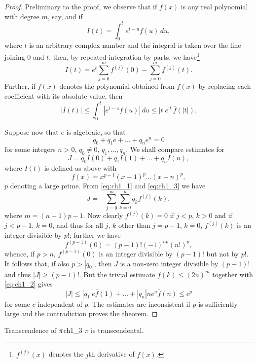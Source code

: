\begin{proof}
Preliminary to the proof, we observe that if $f(x)$ is any real polynomial with degree $m$, say, and if
\[
I(t) = \int_0^t e^{t-u} f(u) \, du,
\]
where $t$ is an arbitrary complex number and the integral is taken over the line joining $0$ and $t$, then, by repeated integration by parts, we have\footnote{$f^{(j)}(x)$ denotes the $j$th derivative of $f(x)$.}
\begin{equation} \label{eq:ch1_1}\tag{1}
I(t) = e^t \sum_{j=0}^m f^{(j)}(0) - \sum_{j=0}^m f^{(j)}(t).
\end{equation}
Further, if $\bar{f}(x)$ denotes the polynomial obtained from $f(x)$ by replacing each coefficient with its absolute value, then
\begin{equation} \label{eq:ch1_2}\tag{2}
|I(t)| \le \int_0^t |e^{t-u} f(u)| \, du \le |t| e^{|t|} \bar{f}(|t|).
\end{equation}

Suppose now that $e$ is algebraic, so that
\begin{equation} \label{eq:ch1_3}\tag{3}
q_0 + q_1 e + \dots + q_n e^n = 0
\end{equation}
for some integers $n>0$, $q_0 \neq 0$, $q_1, \dots, q_n$. We shall compare estimates for
\[
J = q_0 I(0) + q_1 I(1) + \dots + q_n I(n),
\]
where $I(t)$ is defined as above with
\[
f(x) = x^{p-1} (x-1)^p \dots (x-n)^p,
\]
$p$ denoting a large prime. From \eqref{eq:ch1_1} and \eqref{eq:ch1_3} we have
\[
J = -\sum_{j=0}^{m} \sum_{k=0}^{n} q_k f^{(j)}(k),
\]
where $m = (n+1)p - 1$. Now clearly $f^{(j)}(k) = 0$ if $j < p$, $k > 0$ and if $j < p-1$, $k = 0$, and thus for all $j$, $k$ other than $j = p-1$, $k = 0$, $f^{(j)}(k)$ is an integer divisible by $p!$; further we have
\[
f^{(p-1)}(0) = (p-1)! (-1)^{np} (n!)^p,
\]
whence, if $p > n$, $f^{(p-1)}(0)$ is an integer divisible by $(p-1)!$ but not by $p!$. It follows that, if also $p > |q_0|$, then $J$ is a non-zero integer divisible by $(p-1)!$ and thus $|J| \ge (p-1)!$. But the trivial estimate $\bar{f}(k) \le (2n)^m$ together with \eqref{eq:ch1_2} gives
\[
|J| \le |q_1| e \bar{f}(1) + \dots + |q_n| n e^n \bar{f}(n) \le c^p
\]
for some $c$ independent of $p$. The estimates are inconsistent if $p$ is sufficiently large and the contradiction proves the theorem.
\end{proof}


\begin{mythm}{Transcendence of $\pi\index{transcendence of  $\pi$}$}{ch1_3}
$\pi$ is transcendental.
\end{mythm}

